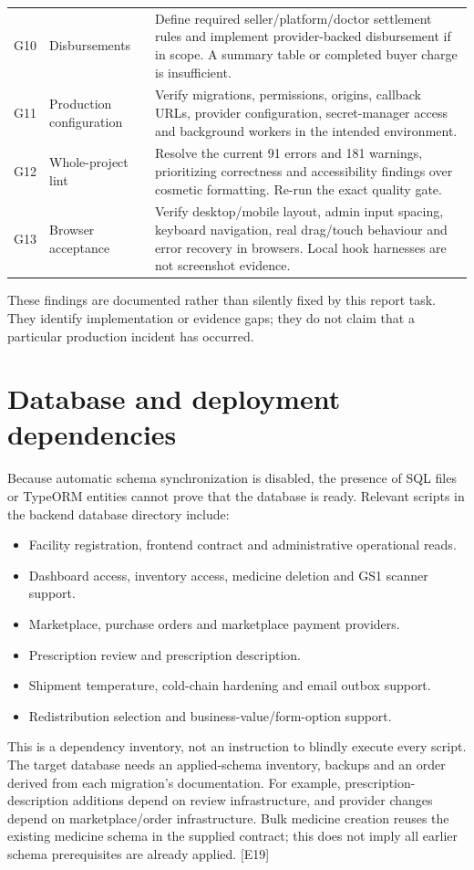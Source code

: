 \documentclass[11pt,a4paper]{article}
\newcommand{\evidence}[1]{\textcolor{muted}{[E#1]}}
\begin{document}
\begin{longtable}{L{0.07\textwidth}L{0.24\textwidth}L{0.58\textwidth}}
G10 & Disbursements & Define required seller/platform/doctor settlement rules and implement provider-backed disbursement if in scope. A summary table or completed buyer charge is insufficient.\\
G11 & Production configuration & Verify migrations, permissions, origins, callback URLs, provider configuration, secret-manager access and background workers in the intended environment.\\
G12 & Whole-project lint & Resolve the current 91 errors and 181 warnings, prioritizing correctness and accessibility findings over cosmetic formatting. Re-run the exact quality gate.\\
G13 & Browser acceptance & Verify desktop/mobile layout, admin input spacing, keyboard navigation, real drag/touch behaviour and error recovery in browsers. Local hook harnesses are not screenshot evidence.\\
\bottomrule
\end{longtable}

These findings are documented rather than silently fixed by this report task. They identify implementation or evidence gaps; they do not claim that a particular production incident has occurred.

\section{Database and deployment dependencies}
Because automatic schema synchronization is disabled, the presence of SQL files or TypeORM entities cannot prove that the database is ready. Relevant scripts in the backend database directory include:
\begin{itemize}
\item Facility registration, frontend contract and administrative operational reads.
\item Dashboard access, inventory access, medicine deletion and GS1 scanner support.
\item Marketplace, purchase orders and marketplace payment providers.
\item Prescription review and prescription description.
\item Shipment temperature, cold-chain hardening and email outbox support.
\item Redistribution selection and business-value/form-option support.
\end{itemize}
This is a dependency inventory, not an instruction to blindly execute every script. The target database needs an applied-schema inventory, backups and an order derived from each migration's documentation. For example, prescription-description additions depend on review infrastructure, and provider changes depend on marketplace/order infrastructure. Bulk medicine creation reuses the existing medicine schema in the supplied contract; this does not imply all earlier schema prerequisites are already applied. \evidence{19}
\end{document}
